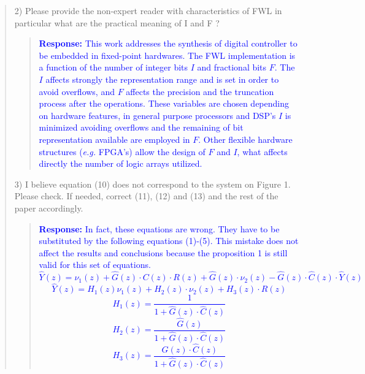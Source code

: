 \documentclass[11pt]{article}
\begin{document}
\begin{quote}
2) Please provide the non-expert reader with characteristics of FWL in particular what are the practical meaning of I and F ?

\begin{quote}
\textcolor{blue}{\textbf{Response:} This work addresses the synthesis of digital controller to be embedded in fixed-point hardwares. The FWL implementation is a function of the number of integer bits $I$ and fractional bits $F$. The $I$ affects strongly the representation range and is set in order to avoid overflows, and $F$ affects the precision and the truncation process after the operations. These variables are chosen depending on hardware features, in general purpose processors and DSP's $I$ is minimized avoiding overflows and the remaining of bit representation available are employed in $F$. Other flexible hardware structures (\textit{e.g.} FPGA's) allow the design of $F$ and $I$, what affects directly the number of logic arrays utilized.}
\end{quote}

3) I believe equation (10) does not correspond to the system on Figure 1. Please check. If needed, correct (11), (12) and (13) and the rest of the paper accordingly.
\begin{quote}
\textcolor{blue}{\textbf{Response:}
In fact, these equations are wrong. They have to be substituted by the following equations (1)-(5). This mistake does not affect the results and conclusions because the proposition 1 is still valid for this set of equations.
\begin{equation}
\hat{Y}(z)=\nu_{1}(z)+\hat{G}(z)\cdot C(z)\cdot R(z)+\hat{G}(z)\cdot\nu_{2}(z)-\hat{G}(z)\cdot \hat{C}(z)\cdot \hat{Y}(z)
\end{equation}
%
\begin{equation}
\hat{Y}(z)=H_{1}(z)\nu_{1}(z)+H_{2}(z)\cdot\nu_{2}(z)+H_{3}(z)\cdot R(z)
\end{equation}
%
\begin{equation}
H_{1}(z)=\frac{1}{1+\hat{G}(z)\cdot \hat{C}(z)}
\end{equation}
\begin{equation}
H_{2}(z)=\frac{\hat{G}(z)}{1+\hat{G}(z)\cdot \hat{C}(z)}
\end{equation}
\begin{equation}
H_{3}(z)=\frac{\hat{G}(z)\cdot \hat{C}(z)}{1+\hat{G}(z)\cdot \hat{C}(z)}
\end{equation}
}
\end{quote}



\end{quote}
\end{document}
